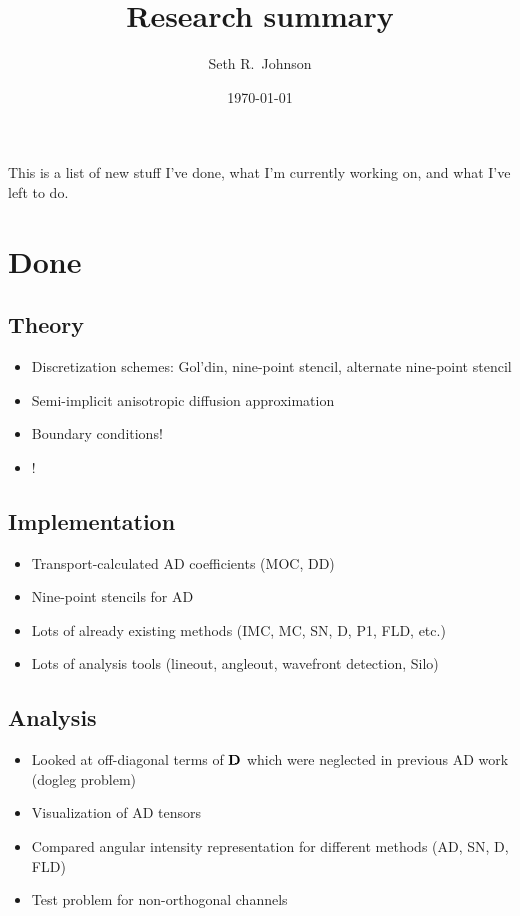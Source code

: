\documentclass[11pt]{SRJresearch}
\author{Seth R.~Johnson}
\date{\today}
\title{Research summary}
\begin{document}
This is a list of new stuff I've done, what I'm currently working on, and what
I've left to do.

\section{Done}
\subsection{Theory}
\begin{itemize}
  \item Discretization schemes: Gol'din, nine-point stencil, alternate
    nine-point stencil
  \item Semi-implicit anisotropic diffusion approximation
  \item Boundary conditions!
  \item \APone!
\end{itemize}

\subsection{Implementation}
\begin{itemize}
  \item Transport-calculated AD coefficients (MOC, DD)
  \item Nine-point stencils for AD
  \item Lots of already existing methods (IMC, MC, SN, D, P1, FLD, etc.)
  \item Lots of analysis tools (lineout, angleout, wavefront detection, Silo)
\end{itemize}

\subsection{Analysis}
\begin{itemize}
  \item Looked at off-diagonal terms of $\mathbf{D}$ which were neglected in
    previous AD work (dogleg problem)
  \item Visualization of AD tensors
  \item Compared angular intensity representation for different methods (AD,
    SN, D, FLD)
  \item Test problem for non-orthogonal channels
\end{itemize}
\end{document}
